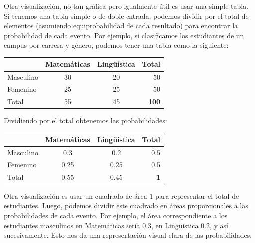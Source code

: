 Otra visualización, no tan gráfica pero igualmente útil es usar una simple tabla. Si tenemos una tabla simple o de doble entrada, podemos dividir por el total de elementos (asumiendo equiprobabilidad de cada resultado) para encontrar la probabilidad de cada evento. Por ejemplo, si clasificamos los estudiantes de un campus por carrera y género, podemos tener una tabla como la siguiente:
\begin{table}[ht]
  \centering
  \begin{tabular}{lccr}
    \toprule
    & Matemáticas & Lingüística & Total \\
    \midrule
    Masculino  & 30 & 20 & 50 \\
    Femenino   & 25 & 25 & 50 \\
    \midrule
    Total      & 55 & 45 & \textbf{100} \\
    \bottomrule
  \end{tabular}
\end{table}

Dividiendo por el total obtenemos las probabilidades:
\begin{table}[ht]
  \centering
  \begin{tabular}{lccr}
    \toprule
    & Matemáticas & Lingüística & Total \\
    \midrule
    Masculino  & \num{0,3} & \num{0,2} & \num{0,5} \\
    Femenino   & \num{0,25} & \num{0,25} & \num{0,5} \\
    \midrule
    Total      & \num{0,55} & \num{0,45} & \textbf{1} \\
    \bottomrule
  \end{tabular}
\end{table}


Otra visualización es usar un cuadrado de área \(1\) para representar el total de estudiantes. Luego, podemos dividir este cuadrado en áreas proporcionales a las probabilidades de cada evento. Por ejemplo, el área correspondiente a los estudiantes masculinos en Matemáticas sería \(\num{0,3}\), en Lingüística \(\num{0,2}\), y así sucesivamente. Esto nos da una representación visual clara de las probabilidades.

